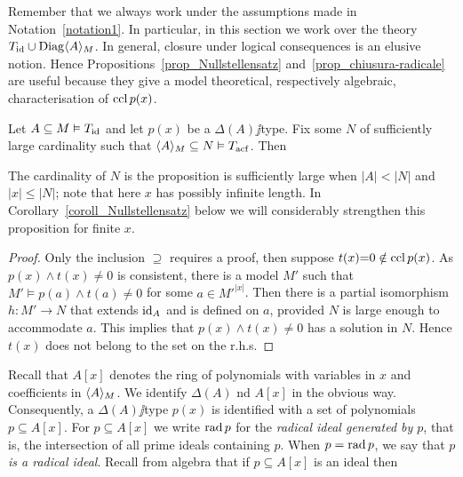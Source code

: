 \documentclass[creche.tex]{subfiles}
\begin{document}

Remember that we always work under the assumptions made in Notation~\ref{notation1}. In particular, in this section we work over the theory $T_{\rm id}\cup\Diag\<A\>_M$. In general, closure under logical consequences is an elusive notion. Hence Propositions~\ref{prop_Nullstellensatz} and~\ref{prop_chiusura-radicale} are useful because they give a model theoretical, respectively algebraic, characterisation of $\ccl\, p(x)$.

\begin{proposition}\label{prop_Nullstellensatz}
Let $A\subseteq M\models T_{\rm id}$ and let $p(x)$ be a $\Delta(A)\jj$type. Fix some $N$ of sufficiently large cardinality such that $\<A\>_M\subseteq N\models T_{\rm acf}$. Then 


\end{proposition}

The cardinality of $N$ is the proposition is sufficiently large when $|A|<|N|$ and $|x|\le |N|$; note that here $x$ has possibly infinite length. In Corollary~\ref{coroll_Nullstellensatz} below we will considerably strengthen this proposition for finite $x$.

\begin{proof} Only the inclusion $\supseteq$ requires a proof, then suppose $t(x){=}0\notin\ccl\, p(x)$. As $p(x)\wedge t(x)\neq0$ is consistent, there is a model $M'$ such that $M'\models p(a)\wedge t(a)\neq0$ for some $a\in {M'}^{|x|}$. Then there is a partial isomorphism $h:M'\to N$ that extends $\id_A$ and is defined on $a$, provided $N$ is large enough to accommodate $a$. This implies that $p(x)\wedge t(x)\neq0$ has a solution in $N$. Hence $t(x)$ does not belong to the set on the r.h.s.  
\end{proof}

Recall that $A[x]$ denotes the ring of polynomials with variables in $x$ and coefficients in $\<A\>_M$. We identify $\Delta(A)$ nd $A[x]$ in the obvious way. Consequently, a $\Delta(A)\jj$type $p(x)$ is identified with a set of polynomials $p\subseteq A[x]$. For $p\subseteq A[x]$ we write \emph{$\rad p$} for the \emph{radical ideal generated by $p$}, that is, the intersection of all prime ideals containing $p$. When $p=\rad p$, we say that  \emph{$p$ is a radical ideal}. Recall from algebra that if $p\subseteq A[x]$ is an ideal then
\end{document}
